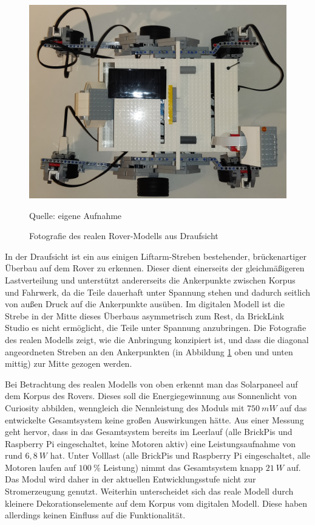\begin{figure}
	\centering
	\includegraphics[width=\textwidth]{../Images/20200429_top_01.jpg}
	\vspace{0.5em}
	\parbox[c]{0.8\linewidth}{\footnotesize
		\centering
		\vspace{1em}
		Quelle: eigene Aufnahme
	}
	\caption{Fotografie des realen Rover-Modells aus Draufsicht}
	\label{fig:rovertopfoto}
\end{figure}

In der Draufsicht ist ein aus einigen Liftarm-Streben bestehender, brückenartiger Überbau auf dem Rover zu erkennen.
Dieser dient einerseits der gleichmäßigeren Lastverteilung und unterstützt andererseits die Ankerpunkte zwischen Korpus und Fahrwerk, da die Teile dauerhaft unter Spannung stehen und dadurch seitlich von außen Druck auf die Ankerpunkte ausüben.
Im digitalen Modell ist die Strebe in der Mitte dieses Überbaus asymmetrisch zum Rest, da BrickLink Studio es nicht ermöglicht, die Teile unter Spannung anzubringen.
Die Fotografie des realen Modells zeigt, wie die Anbringung konzipiert ist, und dass die diagonal angeordneten Streben an den Ankerpunkten (in Abbildung \ref{fig:rovertopfoto} oben und unten mittig) zur Mitte gezogen werden.

Bei Betrachtung des realen Modells von oben erkennt man das Solarpaneel auf dem Korpus des Rovers.
Dieses soll die Energiegewinnung aus Sonnenlicht von Curiosity abbilden, wenngleich die Nennleistung des Moduls mit $750\ mW$ auf das entwickelte Gesamtsystem keine großen Auswirkungen hätte.
Aus einer Messung geht hervor, dass in das Gesamtsystem bereits im Leerlauf (alle BrickPis und Raspberry Pi eingeschaltet, keine Motoren aktiv) eine Leistungsaufnahme von rund $6{,}8\ W$ hat.
Unter Volllast (alle BrickPis und Raspberry Pi eingeschaltet, alle Motoren laufen auf $100\ \%$ Leistung) nimmt das Gesamtsystem knapp $21\ W$ auf.
Das Modul wird daher in der aktuellen Entwicklungsstufe nicht zur Stromerzeugung genutzt.
Weiterhin unterscheidet sich das reale Modell durch kleinere Dekorationselemente auf dem Korpus vom digitalen Modell.
Diese haben allerdings keinen Einfluss auf die Funktionalität.


